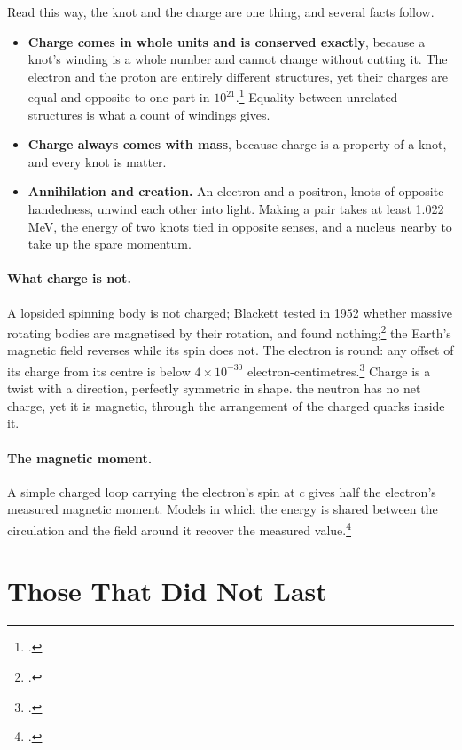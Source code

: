 \documentclass[11pt,a4paper]{article}
\newcommand{\fn}[1]{\footnote{\citealp{#1}.}}
\begin{document}
Read this way, the knot and the charge are one thing, and several facts follow.
\begin{itemize}
\item \textbf{Charge comes in whole units and is conserved exactly}, because a knot's winding is a whole number and cannot change without cutting it. The electron and the proton are entirely different structures, yet their charges are equal and opposite to one part in $10^{21}$.\fn{bressi2011} Equality between unrelated structures is what a count of windings gives.
\item \textbf{Charge always comes with mass}, because charge is a property of a knot, and every knot is matter.
\item \textbf{Annihilation and creation.} An electron and a positron, knots of opposite handedness, unwind each other into light. Making a pair takes at least 1.022 MeV, the energy of two knots tied in opposite senses, and a nucleus nearby to take up the spare momentum.
\end{itemize}

\paragraph{What charge is not.}  A lopsided spinning body is not charged; Blackett tested in 1952 whether massive rotating bodies are magnetised by their rotation, and found nothing;\fn{blackett1952} the Earth's magnetic field reverses while its spin does not. The electron is round: any offset of its charge from its centre is below $4\times10^{-30}$ electron-centimetres.\fn{roussy2023} Charge is a twist with a direction, perfectly symmetric in shape.  the neutron has no net charge, yet it is magnetic, through the arrangement of the charged quarks inside it.

\paragraph{The magnetic moment.} A simple charged loop carrying the electron's spin at $c$ gives half the electron's measured magnetic moment. Models in which the energy is shared between the circulation and the field around it recover the measured value.\fn{hestenes1990} 

\section{Those That Did Not Last}
\label{sec:lost}
\end{document}
